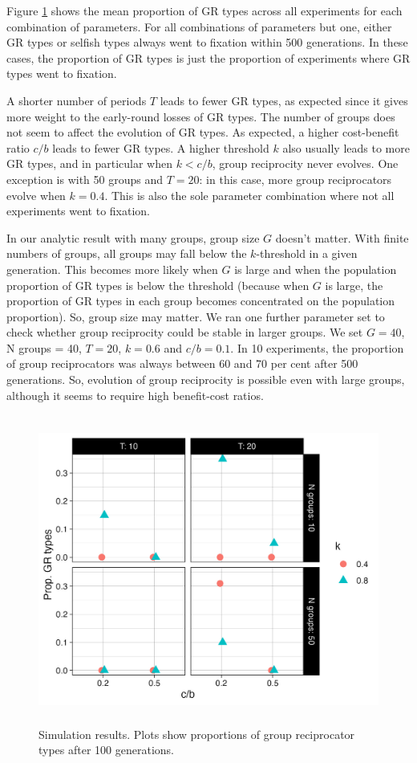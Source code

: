 \documentclass[12pt,a4paper]{article}
\begin{document}
Figure \ref{fig:sims} shows the mean proportion of GR types across all experiments for
each combination of parameters. For all combinations of parameters but one,
either GR types or selfish types always went to fixation within 500 generations. In
these cases, the proportion of GR types is just the proportion of experiments
where GR types went to fixation.

A shorter number of periods $T$ leads to fewer 
GR types, as expected since it gives more weight to the early-round losses of GR 
types. The number of groups does not seem to affect the evolution of GR types. As
expected, a higher cost-benefit ratio $c/b$ leads to fewer GR types. A higher 
threshold $k$ also usually leads to more GR types, and in particular when 
$k < c/b$, group reciprocity never evolves. One exception is with 50 groups
and $T = 20$: in this case, more group reciprocators evolve when $k = 0.4$. 
This is also the sole parameter combination where not all experiments went to 
fixation.


In our analytic result with many groups, group size $G$ doesn't matter. 
With finite numbers of groups, all groups may fall below the $k$-threshold in a
given generation. This becomes more likely when $G$ is large and when the
population proportion of GR types is below the threshold (because when $G$ is
large, the proportion of GR types in each group becomes concentrated on
the population proportion). So, group size may matter. We ran one further 
parameter set to check whether group reciprocity could be
stable in larger groups. We set $G =  40$, N groups = 40, $T = 20$, $k = 0.6$ 
and $c/b = 0.1$. In 10 experiments, the proportion of group reciprocators was
always between 60 and 70 per cent after 500 generations. So, evolution of
group reciprocity is possible even with large groups, although it seems to 
require high benefit-cost ratios.


\begin{figure}[h]
  \caption{Simulation results. Plots show proportions of group reciprocator types after 100 generations.}
  \label{fig:sims}
  \centering
    \includegraphics[height=4in]{R files/basic-experiment.jpeg}
\end{figure}
\end{document}
